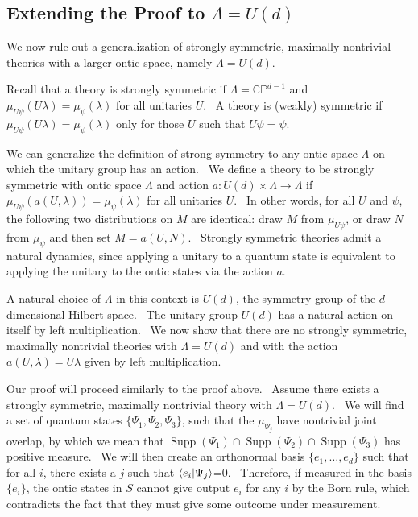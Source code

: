 \documentclass[letterpaper,12pt]{article}
\newcommand{\braket}[2]{\mbox{$ \langle #1 | #2 \rangle $}}
\DeclareMathOperator{\supp}{Supp}
\begin{document}
\subsection{Extending the Proof to $\Lambda=U(d)$}


We now rule out a generalization of strongly symmetric, maximally nontrivial theories with a larger ontic space, namely $\Lambda=U(d)$.

Recall that a theory is strongly symmetric if $\Lambda=\mathbb{CP}^{d-1}$ and $\mu_{U\psi}(U\lambda)=\mu_{\psi}(\lambda)$ for all unitaries $U$. \ A theory is (weakly) symmetric if $\mu_{U\psi}(U\lambda)=\mu_{\psi}(\lambda)$ only for those $U$ such that $U\psi=\psi$.


We can generalize the definition of strong symmetry to any ontic space $\Lambda$ on which the unitary group has an action. \ We define a theory to be strongly symmetric with ontic space $\Lambda$ and action $a: U(d) \times \Lambda \rightarrow \Lambda$ if $\mu_{U\psi}(a(U,\lambda))=\mu_{\psi}(\lambda)$ for all unitaries $U$. \ In other words, for all $U$ and $\psi$, the following two distributions on $M$ are identical: draw $M$ from $\mu_{U\psi}$, or draw $N$ from $\mu_\psi$ and then set $M=a(U,N)$. \ Strongly symmetric theories admit a natural dynamics, since applying a unitary to a quantum state is equivalent to applying the unitary to the ontic states via the action $a$.

A natural choice of $\Lambda$ in this context is $U(d)$, the symmetry group of the $d$-dimensional Hilbert space. \ The unitary group $U(d)$ has a natural action on itself by left multiplication. \ We now show that there are no strongly symmetric, maximally nontrivial theories with $\Lambda=U(d)$ and with the action $a(U, \lambda)=U\lambda$ given by left multiplication.


Our proof will proceed similarly to the proof above. \ Assume there exists a strongly symmetric, maximally nontrivial theory with $\Lambda=U(d)$. \ We will find a set of quantum states $\{\Psi_1,\Psi_2,\Psi_3\}$, such that the $\mu_{\Psi_j}$ have nontrivial joint overlap, by which we mean that $\supp(\Psi_1)\cap \supp(\Psi_2) \cap \supp(\Psi_3) $ has positive measure. \ We will then create an orthonormal basis $\{e_1,\ldots,e_d\}$ such that for all $i$, there exists a $j$ such that $\braket{e_i}{\Psi_j}$=0. \ Therefore, if measured in the basis $\{e_i\}$, the ontic states in $S$ cannot give output $e_i$ for any $i$ by the Born rule, which contradicts the fact that they must give some outcome under measurement.
\end{document}
